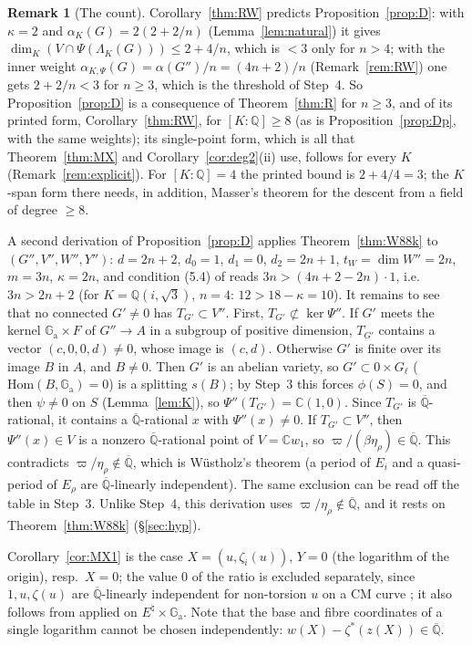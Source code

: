 \documentclass[11pt]{amsart}
\theoremstyle{definition}
\newtheorem{remark}[theorem]{Remark}
\newcommand{\Qb}{\overline{\mathbb{Q}}}
\newcommand{\C}{\mathbb{C}}
\newcommand{\Q}{\mathbb{Q}}
\newcommand{\Ga}{\mathbb{G}_{\mathrm a}}
\newcommand{\vp}{\varpi}
\begin{document}
\begin{remark}[The count]\label{rem:count}
Corollary~\ref{thm:RW} predicts Proposition~\ref{prop:D}: with $\kappa=2$ and $\alpha_K(G)=2(2+2/n)$
(Lemma~\ref{lem:natural}) it gives $\dim_K(V\cap\Psi(\Lambda_K(G)))\le2+4/n$, which is $<3$ only for $n>4$; with the
inner weight $\alpha_{K,\Psi}(G)=\alpha(G'')/n=(4n+2)/n$ (Remark~\ref{rem:RW}) one gets $2+2/n<3$ for $n\ge3$, which is the
threshold of Step~4. So Proposition~\ref{prop:D} is a consequence
of Theorem~\ref{thm:R} for $n\ge3$, and of its printed form, Corollary~\ref{thm:RW}, for $[K:\Q]\ge8$ (as is
Proposition~\ref{prop:Dp}, with the same weights); its single-point form, which is all that Theorem~\ref{thm:MX} and
Corollary~\ref{cor:deg2}(ii) use, follows for every $K$ (Remark~\ref{rem:explicit}). For $[K:\Q]=4$ the printed bound is $2+4/4=3$; the $K$-span form there needs, in
addition, Masser's theorem for the descent from a field of degree $\ge8$.

A second derivation of Proposition~\ref{prop:D} applies Theorem~\ref{thm:W88k} to $(G'',V'',W'',Y'')$: $d=2n+2$,
$d_0=1$, $d_1=0$, $d_2=2n+1$, $t_W=\dim W''=2n$, $m=3n$, $\kappa=2n$, and condition (5.4) of \cite{W88} reads $3n>(4n+2-2n)\cdot1$, i.e.\
$3n>2n+2$ (for $K=\Q(i,\sqrt3)$, $n=4$: $12>18-\kappa=10$). It remains to see that no connected $G'\ne0$ has
$T_{G'}\subset V''$. First, $T_{G'}\not\subset\ker\Psi''$. If $G'$ meets the kernel $\Ga\times F$ of $G''\to A$ in a
subgroup of positive dimension, $T_{G'}$ contains a vector $(c,0,0,d)\ne0$, whose image is $(c,d)$. Otherwise $G'$ is
finite over its image $B$ in $A$, and $B\ne0$. Then $G'$ is an abelian variety, so $G'\subset0\times G_\ell$
($\mathrm{Hom}(B,\Ga)=0$) is a splitting $s(B)$; by Step~3 this forces $\phi(S)=0$, and then $\psi\ne0$ on $S$
(Lemma~\ref{lem:K}), so $\Psi''(T_{G'})=\C(1,0)$. Since $T_{G'}$ is $\Qb$-rational, it contains a $\Qb$-rational $x$ with
$\Psi''(x)\ne0$. If $T_{G'}\subset V''$, then $\Psi''(x)\in V$ is a nonzero $\Qb$-rational point of $V=\C w_1$, so
$\vp/(\beta\eta_\rho)\in\Qb$. This contradicts $\vp/\eta_\rho\notin\Qb$, which is W\"ustholz's theorem \cite{Wu89} (a
period of $E_i$ and a quasi-period of $E_\rho$ are $\Qb$-linearly independent). The same exclusion can be read off the
table in Step~3. Unlike Step~4, this derivation uses $\vp/\eta_\rho\notin\Qb$, and it rests on Theorem~\ref{thm:W88k}
(\S\ref{sec:hyp}).
\end{remark}

\smallskip
Corollary~\ref{cor:MX1} is the case $X=(u,\zeta_i(u))$, $Y=0$ (the logarithm of the origin), resp.\ $X=0$; the value $0$
of the ratio is excluded separately, since $1,u,\zeta(u)$ are $\Qb$-linearly independent for non-torsion $u$ on a CM
curve \cite{La80}; it also follows from \cite{Wu89} applied on $E^\natural\times\Ga$. Note that the base and fibre coordinates of a single logarithm cannot be chosen independently:
$w(X)-\zeta^*(z(X))\in\Qb$.
\end{document}
